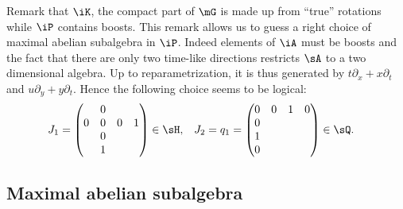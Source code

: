 Remark that $\iK$, the compact part of $\mG$ is made up from ``true'' rotations while $\iP$ contains boosts.  This remark allows us to guess a right choice of maximal abelian subalgebra in $\iP$. Indeed elements of $\iA$ must be boosts and the fact that there are only two time-like directions restricts $\sA$ to a two dimensional algebra. Up to reparametrization, it is thus generated by $t\partial_x+x\partial_t$ and $u\partial_y+y\partial_t$. Hence the following choice seems to be logical:
\begin{align}   \label{EqDevineA}
   J_1&=
\begin{pmatrix}
&0\\
0&0&0&1\\
&0\\
&1
\end{pmatrix}\in\sH,
&J_2&=q_1=
\begin{pmatrix}
0&0&1&0\\
0\\
1\\
0
\end{pmatrix}\in\sQ.
\end{align}

\subsection{Maximal abelian subalgebra}

